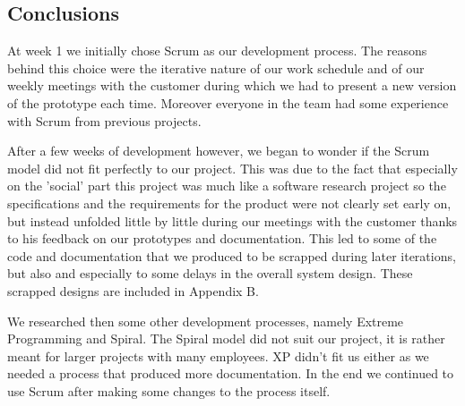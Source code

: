 \subsection{Conclusions}
At week 1 we initially chose Scrum as our development process. The reasons behind this choice were the iterative nature
of our work schedule and of our weekly meetings with the customer during which we had to present a new version
of the prototype each time. Moreover everyone in the team had some experience with Scrum from previous projects.

After a few weeks of development however, we began to wonder if the Scrum model did not fit perfectly to our project.
This was due to the fact that especially on the 'social' part this project was much like a software research project
so the specifications and the requirements for the product were not clearly set early on, but instead unfolded little
by little during our meetings with the customer thanks to his feedback on our prototypes and documentation.
This led to some of the code and documentation that we produced to be scrapped during later iterations,
but also and especially to some delays in the overall system design. These scrapped designs are included in Appendix B.

We researched then some other development processes, namely Extreme Programming and Spiral. The Spiral model 
did not suit our project, it is rather meant for larger projects with many employees. XP didn't fit us either as we needed 
a process that produced more documentation. In the end we continued to use Scrum after making some changes to the 
process itself.

